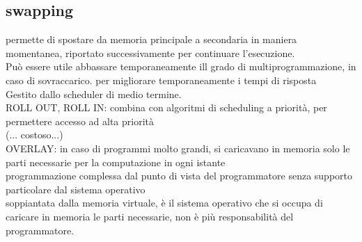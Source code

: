 \documentclass{article}
\begin{document}
\subsection{swapping}
permette di spostare da memoria principale a secondaria in maniera momentanea, riportato successivamente per continuare l'esecuzione.\\
Può essere utile abbassare temporaneamente ill grado di multiprogrammazione, in caso di sovraccarico. per migliorare temporaneamente i tempi di risposta\\
Gestito dallo scheduler di medio termine. \\
ROLL OUT, ROLL IN: combina con algoritmi di scheduling a priorità, per permettere accesso ad alta priorità\\
(... costoso...)\\
OVERLAY: in caso di programmi molto grandi, si caricavano in memoria solo le parti necessarie per la computazione in ogni istante \\
programmazione complessa dal punto di vista del programmatore senza supporto particolare dal sistema operativo\\
soppiantata dalla memoria virtuale, è il sistema operativo che si occupa di caricare in memoria le parti necessarie, non è più 
responsabilità del programmatore.\\
\end{document}
